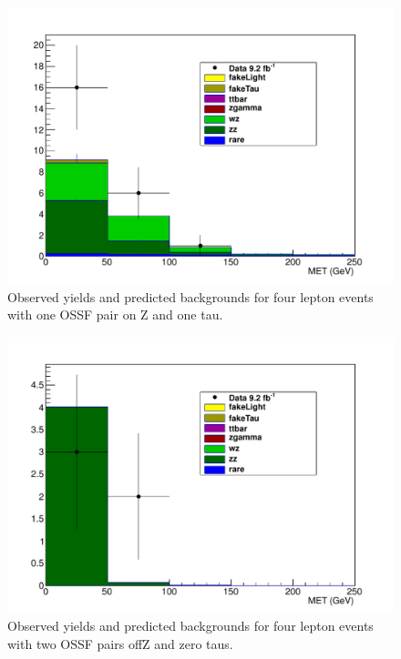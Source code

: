 \begin{figure}[htp]
\begin{center}
\includegraphics[width=1.0\textwidth]{plots/4L_MET_dist_onZ_ossf1_tau1_note.pdf}
\caption{Observed yields and predicted backgrounds for four lepton events with one OSSF pair on Z and one tau.}
\label{fig:L4OSSF1onZtau1}
\end{center}
\end{figure}

\begin{figure}[htp]
\begin{center}
\includegraphics[width=1.0\textwidth]{plots/4L_MET_dist_offZ_ossf2_tau0_note.pdf}
\caption{Observed yields and predicted backgrounds for four lepton events with two OSSF pairs offZ and zero taus.}
\label{fig:L4OSSF2offZtau0}
\end{center}
\end{figure}

